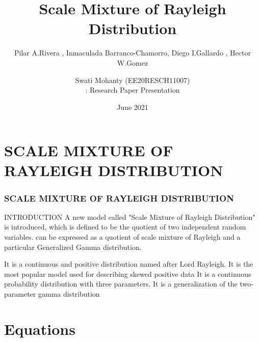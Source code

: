 \documentclass{beamer}
\title[SMR DISTRIBUTION]{Scale Mixture of Rayleigh Distribution}
\subtitle{Pilar A.Rivera , Inmaculada Barranco-Chamorro, Diego I.Gallardo , Hector W.Gomez}
\author{Swati Mohanty (EE20RESCH11007)
\\[AI5002] : Research Paper Presentation}
\institute{IIT, Hyderabad.}
\date{June 2021}
\begin{document}
\begin{frame}
\titlepage
\end{frame}
\section{SCALE MIXTURE OF RAYLEIGH DISTRIBUTION}
\begin{frame}
\frametitle{SCALE MIXTURE OF RAYLEIGH DISTRIBUTION}

\begin{block}{INTRODUCTION}
A new model called "Scale Mixture of Rayleigh Distribution" is introduced, which is defined to be the quotient of two independent random variables.
\newlineIt can be expressed as a quotient of scale mixture of Rayleigh and a particular Generalized Gamma distribution.
\newline

\newline
\hyperlink{a}{} It is a continuous and positive distribution named after Lord Rayleigh. It is the most popular model used for describing skewed positive data
\newline
\newline
\hyperlink{b}{} It is a continuous probability distribution with three parameters. It is a generalization of the two-parameter gamma distribution
\newline

\end{block}
\end{frame}

\section{\textbf{Equations}}
\end{document}
